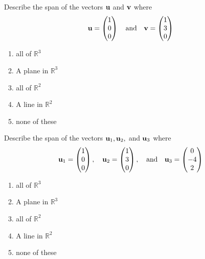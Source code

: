 \begin{problem}
    Describe the span of the vectors ${\bf u}$ and ${\bf v}$ where
    \[ {\bf u} = \begin{pmatrix} 1 \\ 0 \\ 0 \end{pmatrix} \quad \text{and} \quad
    {\bf v} = \begin{pmatrix} 1 \\ 3 \\ 0 \end{pmatrix} \]
    \begin{enumerate}
        \item all of $\mathbb{R}^3$
        \item A plane in $\mathbb{R}^3$
        \item all of $\mathbb{R}^2$
        \item A line in $\mathbb{R}^2$
        \item none of these
    \end{enumerate}
\end{problem}

\begin{problem}
    Describe the span of the vectors ${\bf u}_1, {\bf u}_2,$ and ${\bf u}_3$ where
    \[ {\bf u}_1 = \begin{pmatrix} 1 \\ 0 \\ 0 \end{pmatrix}, \quad
        {\bf u}_2 = \begin{pmatrix} 1 \\ 3 \\ 0 \end{pmatrix}, \quad \text{and} \quad
    {\bf u}_3 = \begin{pmatrix} 0 \\ -4 \\ 2 \end{pmatrix} \]
    \begin{enumerate}
        \item all of $\mathbb{R}^3$
        \item A plane in $\mathbb{R}^3$
        \item all of $\mathbb{R}^2$
        \item A line in $\mathbb{R}^2$
        \item none of these
    \end{enumerate}
\end{problem}



